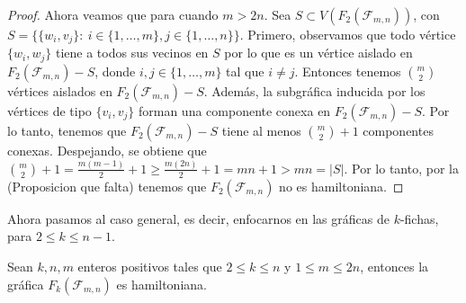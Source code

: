 \begin{proof}
Ahora veamos que para cuando $m>2n$. Sea $S \subset V(F_2(\mathcal{F}_{m,n}))$,
con $S=\{\{w_i,v_j\} \colon\ i \in \{1,\dots,m\},j\in\{1,\dots,n\}\}$. Primero,
observamos que todo v\'ertice $\{w_i,w_j\}$ tiene a todos sus vecinos en $S$ por
lo que es un v\'ertice aislado en $F_2(\mathcal{F}_{m,n})-S$, donde $i,j \in
\{1,\dots,m\}$ tal que $i \neq j$. Entonces tenemos $\binom{m}{2}$ v\'ertices
aislados en $F_2(\mathcal{F}_{m,n})-S$. Adem\'as, la subgr\'afica inducida por
los v\'ertices de tipo $\{v_i,v_j\}$ forman una componente conexa en
$F_2(\mathcal{F}_{m,n})-S$. Por lo tanto, tenemos que $F_2(\mathcal{F}_{m,n})-S$
tiene al menos $\binom{m}{2} + 1$ componentes conexas. Despejando, se obtiene
que $\binom{m}{2} + 1 = \frac{m(m-1)}{2} + 1 \geq \frac{m(2n)}{2} + 1 = mn + 1 >
mn = |S|$. Por lo tanto, por la (Proposicion que falta) tenemos que
$F_2(\mathcal{F}_{m,n})$ no es hamiltoniana.

\end{proof}

Ahora pasamos al caso general, es decir, enfocarnos en las gr\'aficas de
$k$-fichas, para $2 \leq k \leq n-1$.

\begin{teorema}
\label{teo:TokGenerFan}
    Sean $k, n, m$ enteros positivos tales que $2 \leq k \leq n$ y $1 \leq m
       \leq 2n$, entonces la gr\'afica $F_k(\mathcal{F}_{m,n})$ es hamiltoniana.
\end{teorema}

